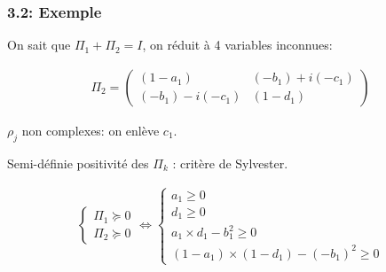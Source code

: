 \documentclass{beamer}
\begin{document}
\begin{frame}
    \frametitle{3.2: Exemple}
    \small
    \begin{block}{}


        On sait que $\Pi_1 + \Pi_2 = I$, on réduit à 4 variables inconnues:

        \begin{align}
            \Pi_2 = \begin{pmatrix}
                (1-a_1) & (-b_1) + i(-c_1) \\ (-b_1) - i(-c_1) & (1-d_1)
            \end{pmatrix} \nonumber
        \end{align}

        $\rho_j$ non complexes: on enlève $c_1$.

        \medbreak

        Semi-définie positivité des $\Pi_k$ : critère de Sylvester.

        \begin{align}
            \begin{cases}
                \Pi_1 \succeq 0\\
                \Pi_2 \succeq 0
            \end{cases}
            \Leftrightarrow
            \begin{cases}
                a_1 \geq 0 \nonumber \\
                d_1 \geq 0 \nonumber \\
                a_1 \times d_1 - b_1^2 \geq 0 \nonumber \\
                (1-a_1) \times (1-d_1) - (-b_1)^2 \geq 0 \nonumber
            \end{cases}
        \end{align}
    \end{block}
\end{frame}

\end{document}
